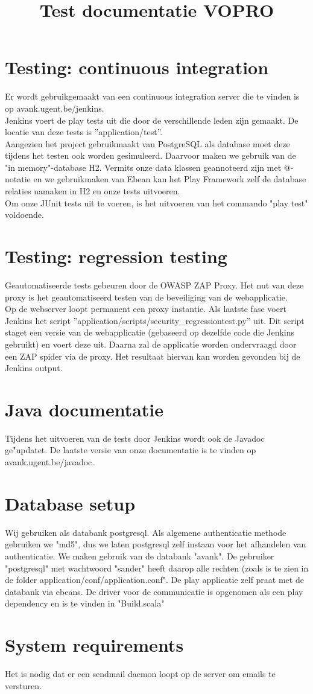 \documentclass[10pt,a4paper]{article}
\title{Test documentatie VOPRO}
\begin{document}
\section*{Testing: continuous integration}
Er wordt gebruikgemaakt van een continuous integration server die te vinden is op avank.ugent.be/jenkins.\\
Jenkins voert de play tests uit die door de verschillende leden zijn gemaakt. De locatie van deze tests is ''application/test''. \\

Aangezien het project gebruikmaakt van PostgreSQL als database moet deze tijdens het testen ook worden gesimuleerd. Daarvoor maken we gebruik van de "in memory"-database H2. Vermits onze data klassen geannoteerd zijn met @-notatie en we gebruikmaken van Ebean kan het Play Framework zelf de database relaties namaken in H2 en onze tests uitvoeren.\\

Om onze JUnit tests uit te voeren, is het uitvoeren van het commando "play test" voldoende.

\section*{Testing: regression testing}
Geautomatiseerde tests gebeuren door de OWASP ZAP Proxy. Het nut van deze proxy is het geautomatiseerd testen van de beveiliging van de webapplicatie. \\
Op de webserver loopt permanent een proxy instantie. Als laatste fase voert Jenkins het script ''application/scripts/security\_regressiontest.py'' uit. Dit script staget een versie van de webapplicatie (gebaseerd op dezelfde code die Jenkins gebruikt) en voert deze uit. Daarna zal de applicatie worden ondervraagd door een ZAP spider via de proxy. Het resultaat hiervan kan worden gevonden bij de Jenkins output. 

\section*{Java documentatie}
Tijdens het uitvoeren van de tests door Jenkins wordt ook de Javadoc ge"updatet. 
De laatste versie van onze documentatie is te vinden op avank.ugent.be/javadoc.

\section*{Database setup}
Wij gebruiken als databank postgresql. Als algemene authenticatie methode gebruiken we "md5", dus we laten postgresql zelf instaan voor het afhandelen van authenticatie. 
We maken gebruik van de databank "avank". De gebruiker "postgresql" met wachtwoord "sander" heeft daarop alle rechten (zoals is te zien in de folder application/conf/application.conf".
De play applicatie zelf praat met de databank via ebeans. De driver voor de communicatie is opgenomen als een play dependency en is te vinden in "Build.scala"
\section*{System requirements}
Het is nodig dat er een sendmail daemon loopt op de server om emails te versturen.
\end{document}
